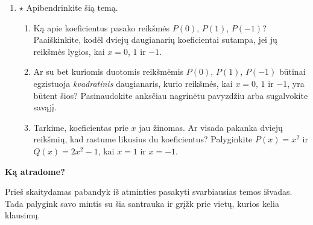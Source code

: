 \documentclass[12pt,a4paper]{exam}
\begin{document}
\begin{enumerate}
\textbf{Sustok ir apibendrink.} Kodėl vienos reikšmės nepakanka daugianariui nustatyti?
\item $\star$ Apibendrinkite šią temą.
\begin{enumerate}
\item Ką apie koeficientus pasako reikšmės $P(0)$, $P(1)$, $P(-1)$? Paaiškinkite, kodėl dviejų daugianarių koeficientai sutampa, jei jų reikšmės lygios, kai $x=0$, $1$ ir $-1$.
\item Ar su bet kuriomis duotomis reikšmėmis $P(0)$, $P(1)$, $P(-1)$ būtinai egzistuoja \emph{kvadratinis} daugianaris, kurio reikšmės, kai $x=0$, $1$ ir $-1$, yra būtent šios? Pasinaudokite anksčiau nagrinėtu pavyzdžiu arba sugalvokite savąjį.
\item Tarkime, koeficientas prie $x$ jau žinomas. Ar visada pakanka dviejų reikšmių, kad rastume likusius du koeficientus? Palyginkite $P(x)=x^2$ ir $Q(x)=2x^2-1$, kai $x=1$ ir $x=-1$.
\end{enumerate}
\end{enumerate}
\newpage
\begin{center}{\Large\bfseries Ką atradome?}\end{center}
Prieš skaitydamas pabandyk iš atminties pasakyti svarbiausias temos išvadas. Tada palygink savo mintis su šia santrauka ir grįžk prie vietų, kurios kelia klausimų.
\end{document}
